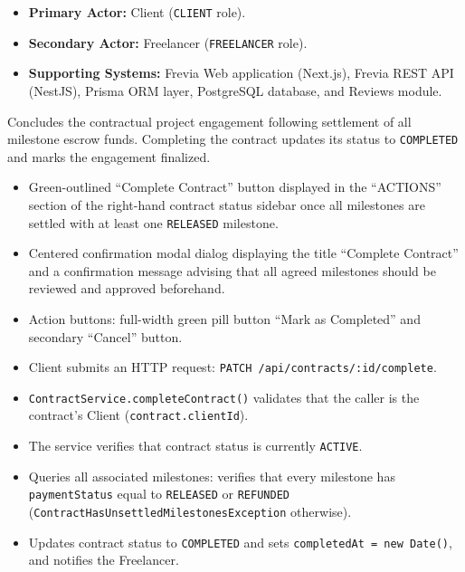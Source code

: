 
\begin{itemize}[leftmargin=1.6em,topsep=3pt,itemsep=2pt,parsep=0pt,label=$\bullet$]
      \item \textbf{Primary Actor:} Client (\texttt{CLIENT} role).
      \item \textbf{Secondary Actor:} Freelancer (\texttt{FREELANCER} role).
      \item \textbf{Supporting Systems:} Frevia Web application (Next.js), Frevia REST API (NestJS), Prisma ORM layer, PostgreSQL database, and Reviews module.
\end{itemize}

\noindent Concludes the contractual project engagement following settlement of all milestone escrow funds. Completing the contract updates its status to \texttt{COMPLETED} and marks the engagement finalized.

\begin{itemize}[leftmargin=1.6em,topsep=3pt,itemsep=2pt,parsep=0pt,label=$\bullet$]
      \item Green-outlined ``Complete Contract'' button displayed in the ``ACTIONS'' section of the right-hand contract status sidebar once all milestones are settled with at least one \texttt{RELEASED} milestone.
      \item Centered confirmation modal dialog displaying the title ``Complete Contract'' and a confirmation message advising that all agreed milestones should be reviewed and approved beforehand.
      \item Action buttons: full-width green pill button ``Mark as Completed'' and secondary ``Cancel'' button.
\end{itemize}

\begin{itemize}[leftmargin=1.6em,topsep=3pt,itemsep=2pt,parsep=0pt,label=$\bullet$]
      \item Client submits an HTTP request: \texttt{PATCH /\allowbreak{}api/\allowbreak{}contracts/\allowbreak{}:\allowbreak{}id/\allowbreak{}complete}.
      \item \texttt{ContractService.completeContract()} validates that the caller is the contract's Client (\texttt{contract.clientId}).
      \item The service verifies that contract status is currently \texttt{ACTIVE}.
      \item Queries all associated milestones: verifies that every milestone has \texttt{paymentStatus} equal to \texttt{RELEASED} or \texttt{REFUNDED} (\texttt{ContractHasUnsettledMilestonesException} otherwise).
      \item Updates contract status to \texttt{COMPLETED} and sets \texttt{completedAt = new Date()}, and notifies the Freelancer.
\end{itemize}

